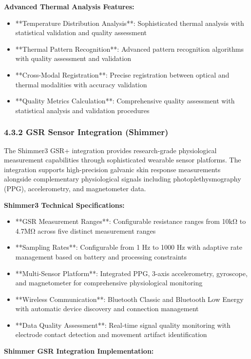 \documentclass[12pt,a4paper]{article}
\begin{document}
\textbf{Advanced Thermal Analysis Features:}

\begin{itemize}
\item **Temperature Distribution Analysis**: Sophisticated thermal analysis with statistical validation and quality
  assessment
\item **Thermal Pattern Recognition**: Advanced pattern recognition algorithms with quality assessment and validation
\item **Cross-Modal Registration**: Precise registration between optical and thermal modalities with accuracy validation
\item **Quality Metrics Calculation**: Comprehensive quality assessment with statistical analysis and validation procedures

\end{itemize}
\subsubsection{4.3.2 GSR Sensor Integration (Shimmer)}

The Shimmer3 GSR+ integration provides research-grade physiological measurement capabilities through sophisticated
wearable sensor platforms. The integration supports high-precision galvanic skin response measurements alongside
complementary physiological signals including photoplethysmography (PPG), accelerometry, and magnetometer data.

\textbf{Shimmer3 Technical Specifications:}

\begin{itemize}
\item **GSR Measurement Ranges**: Configurable resistance ranges from 10kΩ to 4.7MΩ across five distinct measurement ranges
\item **Sampling Rates**: Configurable from 1 Hz to 1000 Hz with adaptive rate management based on battery and processing
  constraints
\item **Multi-Sensor Platform**: Integrated PPG, 3-axis accelerometry, gyroscope, and magnetometer for comprehensive
  physiological monitoring
\item **Wireless Communication**: Bluetooth Classic and Bluetooth Low Energy with automatic device discovery and connection
  management
\item **Data Quality Assessment**: Real-time signal quality monitoring with electrode contact detection and movement
  artifact identification

\end{itemize}
\textbf{Shimmer GSR Integration Implementation:}
\end{document}
